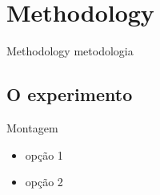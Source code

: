 \section{Methodology}

\begin{frame}{Methodology}
    metodologia
\end{frame}

\subsection{O experimento}

\begin{frame}{Montagem}
    \begin{itemize}[<+-|alert@+>]\color{gray}
        \item opção 1
        \item opção 2
    \end{itemize}
\end{frame}